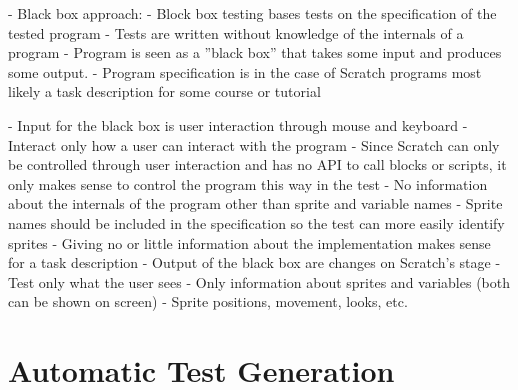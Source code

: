 - Black box approach:
    - Block box testing bases tests on the specification of the tested program
    - Tests are written without knowledge of the internals of a program
    - Program is seen as a ''black box'' that takes some input and produces some output.
    - Program specification is in the case of Scratch programs most likely a task description for some course or tutorial

    - Input for the black box is user interaction through mouse and keyboard
    - Interact only how a user can interact with the program
        - Since Scratch can only be controlled through user interaction and has no API to call blocks or scripts,
          it only makes sense to control the program this way in the test
        - No information about the internals of the program other than sprite and variable names
            - Sprite names should be included in the specification so the test can more easily identify sprites
            - Giving no or little information about the implementation makes sense for a task description
    - Output of the black box are changes on Scratch's stage
    - Test only what the user sees
        - Only information about sprites and variables (both can be shown on screen)
        - Sprite positions, movement, looks, etc.

\section{Automatic Test Generation}%
\label{sec:automatic_test_generation}


